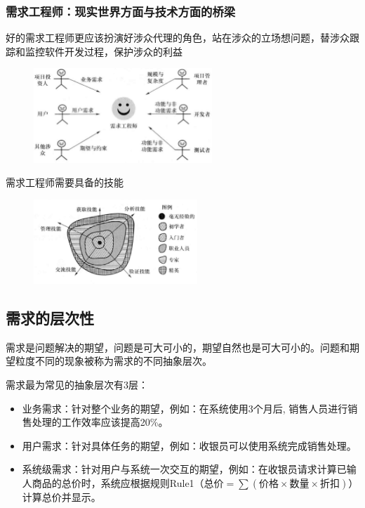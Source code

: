 \subsubsection{需求工程师：现实世界方面与技术方面的桥梁}
好的需求工程师更应该扮演好涉众代理的角色，站在涉众的立场想问题，替涉众跟踪和监控软件开发过程，保护涉众的利益
\begin{figure}[H]
	\centering
	\includegraphics[width=0.6\textwidth]{img/需求工程师的桥梁作用.png}
\end{figure}

需求工程师需要具备的技能
\begin{figure}[H]
	\centering
	\includegraphics[width=0.55\textwidth]{img/需求工程师需要具备的技能.png}
\end{figure}

\subsection{需求的层次性}
需求是问题解决的期望，问题是可大可小的，期望自然也是可大可小的。问题和期望粒度不同的现象被称为需求的不同抽象层次。

需求最为常见的抽象层次有3层：
\begin{itemize}
    \item 业务需求：针对整个业务的期望，例如：在系统使用3个月后, 销售人员进行销售处理的工作效率应该提高20\%。
    \item 用户需求：针对具体任务的期望，例如：收银员可以使用系统完成销售处理。
    \item 系统级需求：针对用户与系统一次交互的期望，例如：在收银员请求计算已输人商品的总价时，系统应根据规则Rule1（$\mbox{总价}=\sum(\mbox{价格}\times \mbox{数量} \times \mbox{折扣})$）计算总价并显示。
\end{itemize}

